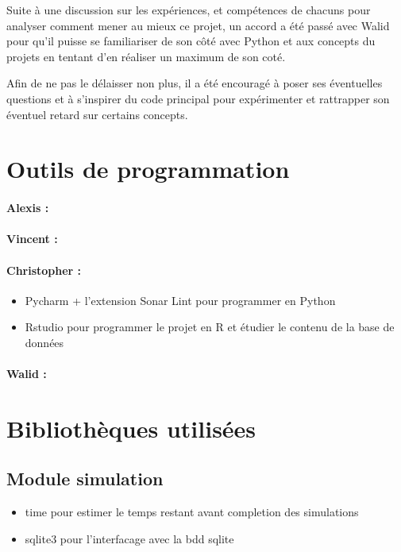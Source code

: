 \documentclass[
	headsepline=on,
	footsepline=on,
	twoside=off,
	abstract=on,
	DIV=10
]{scrreprt}
\begin{document}
		Suite à une discussion sur les expériences, et compétences de chacuns pour analyser comment mener au mieux ce projet, un accord a été passé avec Walid pour qu'il puisse se familiariser de son côté avec Python et aux concepts du projets en tentant d'en réaliser un maximum de son coté.
		
		Afin de ne pas le délaisser non plus, il a été encouragé à poser ses éventuelles questions et à s'inspirer du code principal pour expérimenter et rattrapper son éventuel retard sur certains concepts.
		
		
			\section{Outils de programmation}
				\paragraph{Alexis :}
				\paragraph{Vincent :}
			
				\paragraph{Christopher :}
				\begin{itemize}
					\item Pycharm + l'extension Sonar Lint pour programmer en Python
					\item Rstudio pour programmer le projet en R et étudier le contenu de la base de données
				\end{itemize}
				\paragraph{Walid :}
			
			\section{Bibliothèques utilisées}
				\subsection{Module simulation}
				
				\begin{itemize}
					\item time pour estimer le temps restant avant completion des simulations
					\item sqlite3 pour l'interfacage avec la bdd sqlite
				\end{itemize}
			
\end{document}
